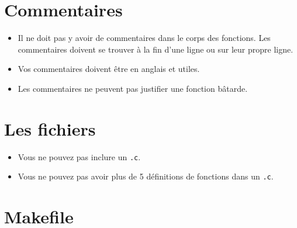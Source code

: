 \documentclass{42-fr}
\begin{document}
    \section{Commentaires}

        \begin{itemize}

            \item Il ne doit pas y avoir de commentaires dans le corps des fonctions.
                Les commentaires doivent se trouver à la fin d'une ligne ou sur leur propre ligne.

            \item Vos commentaires doivent être en anglais et utiles.

            \item Les commentaires ne peuvent pas justifier une fonction bâtarde.

        \end{itemize}
        \newpage


    \section{Les fichiers}

        \begin{itemize}

            \item Vous ne pouvez pas inclure un \texttt{.c}.

            \item Vous ne pouvez pas avoir plus de 5 définitions de fonctions dans un \texttt{.c}.

        \end{itemize}
        \newpage


    \section{Makefile}
\end{document}
